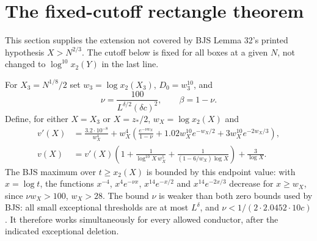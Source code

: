 \documentclass[11pt]{article}
\theoremstyle{definition}
\begin{document}
\section{The fixed-cutoff rectangle theorem}\label{sec:rectangle}

This section supplies the extension not covered by BJS Lemma 32's
printed hypothesis $X>N^{2/3}$.  The cutoff below is fixed for all
boxes at a given $N$, not changed to $\log^{10}x_2(Y)$ in the last line.

For $X_3=N^{1/8}/2$ set $w_3=\log x_2(X_3)$,
$D_0=w_3^{10}$, and
\[
 \nu=\frac{100}{L^{\delta/2}(\delta c)^2},\qquad\beta=1-\nu.
\]
Define, for either $X=X_3$ or $X=z_*/2$, $w_X=\log x_2(X)$ and
\begin{equation}\label{eq:vformula}
\begin{split}
 v'(X)&=\frac{3.2\cdot10^{-8}}{w_X^4}
  +w_X^4\left(\frac{e^{-\nu w_X}}{1-\nu}
           +1.02w_X^{10}e^{-w_X/2}+3w_X^{10}e^{-2w_X/3}\right),\\
 v(X)&=v'(X)\left(1+\frac1{\log^{10}X\,w_X^5}
       +\frac1{(1-6/w_X)\log X}\right)+\frac3{\log X}.
\end{split}
\end{equation}
The BJS maximum over $t\ge x_2(X)$ is bounded by this endpoint value:
with $x=\log t$, the functions $x^{-4}$, $x^4e^{-\nu x}$,
$x^{14}e^{-x/2}$ and $x^{14}e^{-2x/3}$ decrease for
$x\ge w_X$, since $\nu w_X>100$, $w_X>28$.
The bound $\nu$ is weaker than both zero bounds used by BJS: all small
exceptional thresholds are at most $L^\delta$, and
$\nu<1/(2\cdot2.0452\cdot10c)$.  It therefore works simultaneously
for every allowed conductor, after the indicated exceptional deletion.
\end{document}

